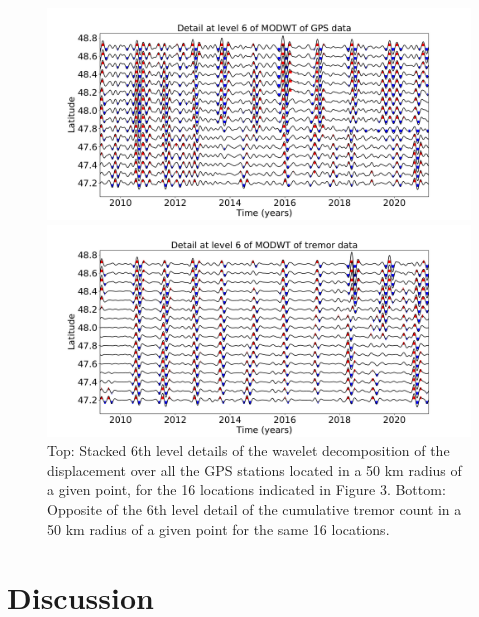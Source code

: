 \documentclass[draft]{agujournal2018}
\begin{document}
\begin{figure}
\noindent\includegraphics[width=\textwidth, trim={0cm 0cm 0cm 0cm},clip]{figures/GPS_detail_6.pdf}

\noindent\includegraphics[width=\textwidth, trim={0cm 0cm 0cm 0cm},clip]{figures/tremor_detail_6.pdf}
\caption{Top: Stacked 6th level details of the wavelet decomposition of the displacement over all the GPS stations located in a 50 km radius of a given point, for the 16 locations indicated in Figure 3. Bottom: Opposite of the 6th level detail of the cumulative tremor count in a 50 km radius of a given point for the same 16 locations.}
\label{pngfiguresample}
\end{figure}

\section{Discussion}
\end{document}
